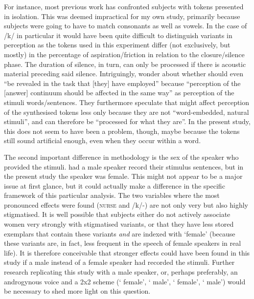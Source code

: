 For instance, most previous work has confronted subjects with   tokens presented in isolation.
This was deemed impractical for my own study, primarily because subjects were going to have to match consonants as well as vowels.
In the case of /k/ in particular it would have been quite difficult to distinguish variants in perception as the tokens used in this experiment differ (not exclusively, but mostly) in the percentage of aspiration/friction in relation to the closure/silence phase.
The duration of silence, in turn, can only be processed if there is acoustic material preceding said silence.
Intriguingly, \textcite[887--888]{haydrager2010} wonder about whether  should even ``be revealed in the task that [they] have employed'' because ``perception of the [answer] continuum should be affected in the same way'' as perception of the stimuli words/sentences.
They furthermore speculate that  might affect perception of the synthesised tokens less only because they are not ``word-embedded, natural stimuli'', and can therefore be ``processed for what they are''.
In the present study, this does not seem to have been a problem, though, maybe because the  tokens still sound artificial enough, even when they occur within a word.

The second important difference in methodology is the sex of the speaker who provided the stimuli.
\textcite{hayetal2006a,haydrager2010} had a male speaker record their stimulus sentences, but in the present study the speaker was female.
This might not appear to be a major issue at first glance, but it could actually make a difference in the specific framework of this particular analysis.
The two variables where the most pronounced  effects were found (\textsc{nurse} and /k/-) are not only very  but also highly stigmatised.
It is well possible that subjects either do not actively associate women very strongly with stigmatised variants, or that they have less stored exemplars that contain these variants \emph{and} are indexed with `female' (because these variants are, in fact, less frequent in the speech of female speakers in real life).
It is therefore conceivable that stronger  effects could have been found in this study if a male instead of a female speaker had recorded the stimuli.
Further research replicating this study with a male speaker, or, perhaps preferably, an androgynous voice and a 2x2  scheme (` female', ` male', ` female', ` male') would be necessary to shed more light on this question.


